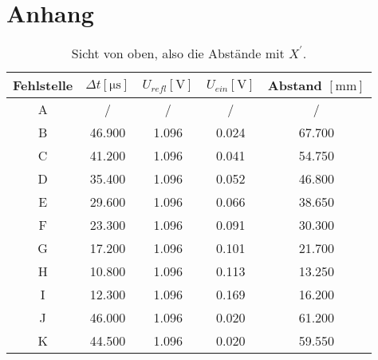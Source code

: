 \section{Anhang}

\begin{table}
    \centering
    \caption{Sicht von oben, also die Abstände mit $X^{'}$.}
    \label{tab:1}
    \begin{tabular}{c | c c c c}
        \toprule
        Fehlstelle & $\Delta t [\si{\micro\second}] $ &  $U_{refl} [\si{\volt}]$ & $U_{ein}[\si{\volt}]$ & Abstand $[\si{\milli\meter}]$ \\
        \midrule
        A & / & / & / & / \\
        B & 46.900 & 1.096 & 0.024  & 67.700 \\
        C & 41.200 & 1.096 & 0.041  & 54.750 \\
        D & 35.400 & 1.096 & 0.052  & 46.800 \\
        E & 29.600 & 1.096 & 0.066  & 38.650 \\
        F & 23.300 & 1.096 & 0.091  & 30.300 \\
        G & 17.200 & 1.096 & 0.101  & 21.700 \\
        H & 10.800 & 1.096 & 0.113  & 13.250 \\
        I & 12.300 & 1.096 & 0.169  & 16.200 \\
        J & 46.000 & 1.096 & 0.020  & 61.200 \\
        K & 44.500 & 1.096 & 0.020  & 59.550 \\
    \end{tabular}
\end{table}

